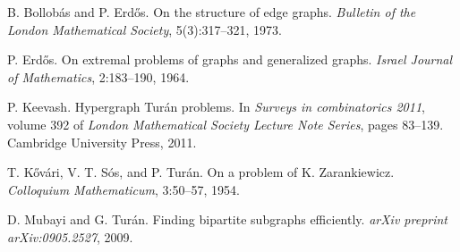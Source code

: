 \documentclass[11pt,a4paper]{article}
\theoremstyle{definition}
\begin{document}
\begin{thebibliography}{99}

B. Bollobás and P. Erdős.
On the structure of edge graphs.
\textit{Bulletin of the London Mathematical Society}, 5(3):317–321, 1973.

P. Erdős.
On extremal problems of graphs and generalized graphs.
\textit{Israel Journal of Mathematics}, 2:183–190, 1964.

P. Keevash.
Hypergraph Turán problems.
In \textit{Surveys in combinatorics 2011}, volume 392 of \textit{London Mathematical Society Lecture Note Series}, pages 83--139. Cambridge University Press, 2011.

T. Kővári, V. T. Sós, and P. Turán.
On a problem of K. Zarankiewicz.
\textit{Colloquium Mathematicum}, 3:50–57, 1954.

D. Mubayi and G. Turán.
Finding bipartite subgraphs efficiently.
\textit{arXiv preprint arXiv:0905.2527}, 2009.


\end{thebibliography}
\end{document}
